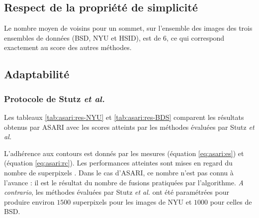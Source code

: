 \subsection{Respect de la propriété de simplicité}

Le nombre moyen de voisins pour un sommet, sur l'ensemble des images des trois ensembles de données (BSD, NYU et HSID), est de $6$, ce qui correspond exactement au score des autres méthodes.

\subsection{Adaptabilité}

\subsubsection{Protocole de Stutz \textit{et al.}}

Les tableaux \ref{tab:asari:res-NYU} et  \ref{tab:asari:res-BDS} comparent les résultats obtenus par ASARI avec les scores atteints par les méthodes évaluées par Stutz \textit{et al.} 

L'adhérence aux contours est donnés par les mesures  (équation \ref{eq:asari:es}) et  (équation \ref{eq:asari:rc}). Les performances atteintes sont mises en regard du nombre de superpixels . Dans le cas d'ASARI, ce nombre n'est pas connu à l'avance : il est le résultat du nombre de fusions pratiquées par l'algorithme. \textit{A contrario}, les méthodes évaluées par Stutz \textit{et al.} ont été paramétrées pour produire environ $1500$ superpixels pour les images de NYU et $1000$ pour celles de BSD.



